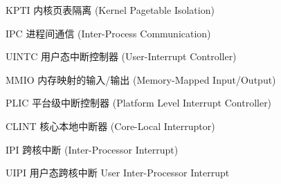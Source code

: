 
\begin{denotation}[3cm]
  \item[KPTI] {内核页表隔离 (Kernel Pagetable Isolation)}
  \item[IPC] {进程间通信 (Inter-Process Communication)}
  \item[UINTC] {用户态中断控制器 (User-Interrupt Controller)}
  \item[MMIO] {内存映射的输入/输出 (Memory-Mapped Input/Output)}  
  \item[PLIC] {平台级中断控制器 (Platform Level Interrupt Controller)}
  \item[CLINT] {核心本地中断器 (Core-Local Interruptor)}
  \item[IPI] {跨核中断 (Inter-Processor Interrupt)}
  \item[UIPI] {用户态跨核中断 {User Inter-Processor Interrupt}}
\end{denotation}
